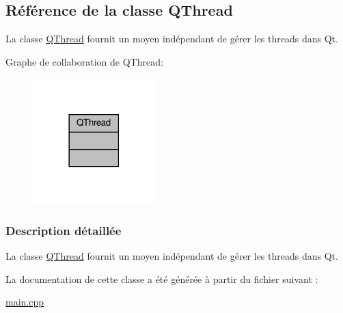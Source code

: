 \hypertarget{class_q_thread}{}\subsection{Référence de la classe Q\+Thread}
\label{class_q_thread}


La classe \hyperlink{class_q_thread}{Q\+Thread} fournit un moyen indépendant de gérer les threads dans Qt.  




Graphe de collaboration de Q\+Thread\+:\nopagebreak
\begin{figure}[H]
\begin{center}
\leavevmode
\includegraphics[width=134pt]{class_q_thread__coll__graph}
\end{center}
\end{figure}


\subsubsection{Description détaillée}
La classe \hyperlink{class_q_thread}{Q\+Thread} fournit un moyen indépendant de gérer les threads dans Qt. 

La documentation de cette classe a été générée à partir du fichier suivant \+:\begin{DoxyCompactItemize}
\item 
\hyperlink{main_8cpp}{main.\+cpp}\end{DoxyCompactItemize}
